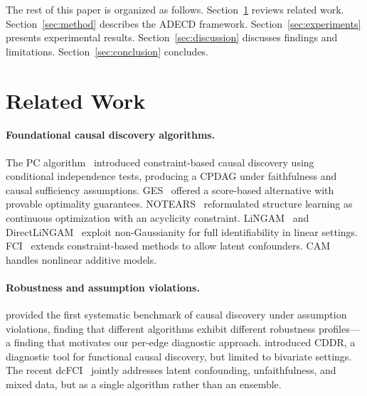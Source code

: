 \documentclass{article}
\newcommand{\adecd}{\textsc{ADECD}}
\begin{document}
The rest of this paper is organized as follows.
Section~\ref{sec:related} reviews related work.
Section~\ref{sec:method} describes the \adecd{} framework.
Section~\ref{sec:experiments} presents experimental results.
Section~\ref{sec:discussion} discusses findings and limitations.
Section~\ref{sec:conclusion} concludes.

\section{Related Work}
\label{sec:related}

\paragraph{Foundational causal discovery algorithms.}
The PC algorithm~\citep{spirtes2000causation} introduced constraint-based causal discovery using conditional independence tests, producing a CPDAG under faithfulness and causal sufficiency assumptions.
GES~\citep{chickering2002optimal} offered a score-based alternative with provable optimality guarantees.
NOTEARS~\citep{zheng2018dags} reformulated structure learning as continuous optimization with an acyclicity constraint.
LiNGAM~\citep{shimizu2006linear} and DirectLiNGAM~\citep{shimizu2011directlingam} exploit non-Gaussianity for full identifiability in linear settings.
FCI~\citep{spirtes2000causation} extends constraint-based methods to allow latent confounders.
CAM~\citep{buhlmann2014cam} handles nonlinear additive models.

\paragraph{Robustness and assumption violations.}
\citet{montagna2023assumption} provided the first systematic benchmark of causal discovery under assumption violations, finding that different algorithms exhibit different robustness profiles---a finding that motivates our per-edge diagnostic approach.
\citet{prakash2024diagnostic} introduced CDDR, a diagnostic tool for functional causal discovery, but limited to bivariate settings.
The recent dcFCI~\citep{ribeiro2025dcfci} jointly addresses latent confounding, unfaithfulness, and mixed data, but as a single algorithm rather than an ensemble.
\end{document}
